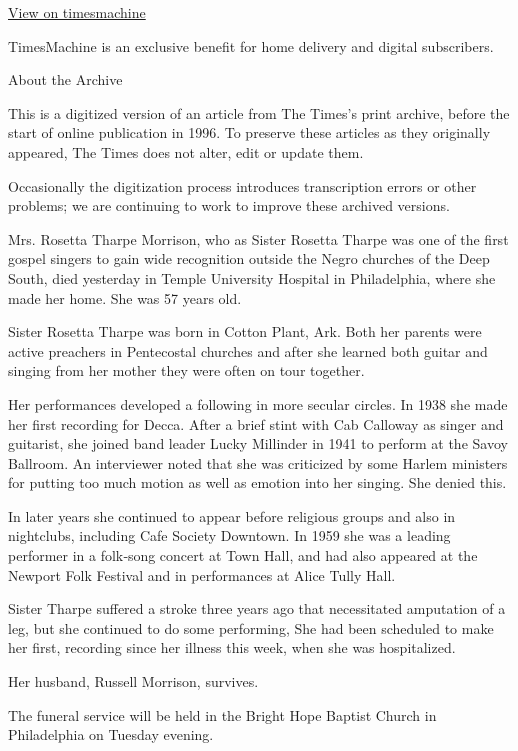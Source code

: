 \href{http://timesmachine.nytimes3xbfgragh.onion/timesmachine/1973/10/10/91006788.html}{View
on timesmachine}

TimesMachine is an exclusive benefit for home delivery and digital
subscribers.

About the Archive

This is a digitized version of an article from The Times's print
archive, before the start of online publication in 1996. To preserve
these articles as they originally appeared, The Times does not alter,
edit or update them.

Occasionally the digitization process introduces transcription errors or
other problems; we are continuing to work to improve these archived
versions.

Mrs. Rosetta Tharpe Morrison, who as Sister Rosetta Tharpe was one of
the first gospel singers to gain wide recognition outside the Negro
churches of the Deep South, died yesterday in Temple University Hospital
in Philadelphia, where she made her home. She was 57 years old.

Sister Rosetta Tharpe was born in Cotton Plant, Ark. Both her parents
were active preachers in Pentecostal churches and after she learned both
guitar and singing from her mother they were often on tour together.

Her performances developed a following in more secular circles. In 1938
she made her first recording for Decca. After a brief stint with Cab
Calloway as singer and guitarist, she joined band leader Lucky Millinder
in 1941 to perform at the Savoy Ballroom. An interviewer noted that she
was criticized by some Harlem ministers for putting too much motion as
well as emotion into her singing. She denied this.

In later years she continued to appear before religious groups and also
in nightclubs, including Cafe Society Downtown. In 1959 she was a
leading performer in a folk‐song concert at Town Hall, and had also
appeared at the Newport Folk Festival and in performances at Alice Tully
Hall.

Sister Tharpe suffered a stroke three years ago that necessitated
amputation of a leg, but she continued to do some performing, She had
been scheduled to make her first, recording since her illness this week,
when she was hospitalized.

Her husband, Russell Morrison, survives.

The funeral service will be held in the Bright Hope Baptist Church in
Philadelphia on Tuesday evening.


